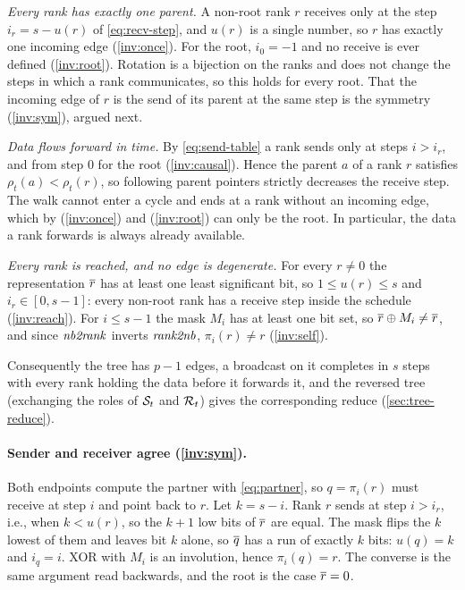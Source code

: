 \emph{Every rank has exactly one parent.}
A non-root rank $r$ receives only at the step $i_r=s-u(r)$ of \cref{eq:recv-step}, and $u(r)$ is a single number, so $r$ has exactly one incoming edge (\ref{inv:once}).
For the root, $i_0=-1$ and no receive is ever defined (\ref{inv:root}).
Rotation is a bijection on the ranks and does not change the steps in which a rank communicates, so this holds for every root.
That the incoming edge of $r$ is the send of its parent at the same step is the symmetry (\ref{inv:sym}), argued next.

\emph{Data flows forward in time.}
By \cref{eq:send-table} a rank sends only at steps $i>i_r$, and from step $0$ for the root (\ref{inv:causal}).
Hence the parent $a$ of a rank $r$ satisfies $\rho_t(a)<\rho_t(r)$, so following parent pointers strictly decreases the receive step.
The walk cannot enter a cycle and ends at a rank without an incoming edge, which by (\ref{inv:once}) and (\ref{inv:root}) can only be the root.
In particular, the data a rank forwards is always already available.

\emph{Every rank is reached, and no edge is degenerate.}
For every $r\neq0$ the representation $\overline{r}$ has at least one least significant bit, so $1\le u(r)\le s$ and $i_r\in[0,s-1]$: every non-root rank has a receive step inside the schedule (\ref{inv:reach}).
For $i\le s-1$ the mask $M_i$ has at least one bit set, so $\overline{r}\oplus M_i\neq\overline{r}$, and since $\mathit{nb2rank}$ inverts $\mathit{rank2nb}$, $\pi_i(r)\neq r$ (\ref{inv:self}).

Consequently the tree has $p-1$ edges, a broadcast on it completes in $s$ steps with every rank holding the data before it forwards it, and the reversed tree (exchanging the roles of $\mathcal{S}_t$ and $\mathcal{R}_t$) gives the corresponding reduce (\cref{sec:tree-reduce}).

\paragraph{Sender and receiver agree (\ref{inv:sym}).}
Both endpoints compute the partner with \cref{eq:partner}, so $q=\pi_i(r)$ must receive at step $i$ and point back to $r$.
Let $k=s-i$.
Rank $r$ sends at step $i>i_r$, i.e., when $k<u(r)$, so the $k+1$ low bits of $\overline{r}$ are equal.
The mask flips the $k$ lowest of them and leaves bit $k$ alone, so $\overline{q}$ has a run of exactly $k$ bits: $u(q)=k$ and $i_q=i$.
XOR with $M_i$ is an involution, hence $\pi_i(q)=r$.
The converse is the same argument read backwards, and the root is the case $\overline{r}=0$.

